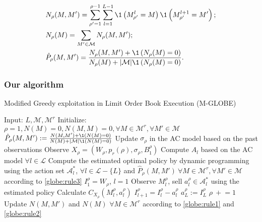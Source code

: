             \begin{align}
                & N_\rho(M, M') = \sum_{\rho' = 1}^{\rho-1} \sum_{l = 1}^{L-1} \1\left(M_{\rho'}^l = M\right) \1\left(M_{\rho'}^{l+1} = M'\right); \label{globe:rule1}\\
                & N_\rho(M) = \sum_{M'\in\mathcal{M}}N_\rho(M, M'); \label{globe:rule2}\\
                & \hat P_\rho(M, M') = \frac{N_\rho(M, M') + \1\left(N_\rho(M) = 0\right)}{N_\rho(M) + |\mathcal M|\1\left(N_\rho(M) = 0\right)}. \label{globe:rule3}
            \end{align}

        \subsubsection{Our algorithm}
            \begin{algorithm}
                \caption[Modified GLOBE Algorithm]{Modified Greedy exploitation in Limit Order Book Execution (M-GLOBE)}
                \begin{algorithmic}
                    \State Input: $L, \mathcal{M}, \mathcal{M}^r$
                    \State Initialize: $\rho = 1, N(M)=0, N(M,M)=0, \forall M \in \mathcal{M}^r , \forall M' \in \mathcal{M}$
                        \State $\hat P_\rho (M, M') := \frac{N(M, M') + \1(N(M) = 0)}{N(M) + |\mathcal M| \1 (N(M) = 0)}$
                        \State Update $\sigma_\rho$ in the AC model based on the past observations
                        \State Observe $X_\rho = (W_\rho, p_r(\rho), \sigma_\rho, B_1^\rho)$
                        \State Compute $A_l$ based on the AC model $\forall l \in \mathcal{L}$
                        \State Compute the estimated optimal policy by dynamic programming using the action set $\mathcal A_l^*$, $\forall l \in \mathcal{L} - \{L\}$ and $\hat P_\rho (M, M')\ \forall M \in \mathcal{M}^r, \forall M' \in \mathcal M$ according to \eqref{globe:rule3}
                        \State $I_1^\rho = W_\rho$, $l=1$
                            \State Observe $M_l^\rho$, sell $a_l^\rho\in \mathcal{A}^*_l$ using the estimated policy
                            \State Calculate $C_{X_\rho}(M_l^\rho, a_l^\rho)$
                            \State $I_{l+1}^\rho = I_l^\rho - a_l^\rho$
                        \EndFor
                        \State $a_{L}^\rho := I_L^\rho$
                        \State $\rho\ +\!\!= 1$
                        \State Update $N(M, M')$ and $N(M)$ $\forall M \in \mathcal{M}^r$ according to \eqref{globe:rule1} and \eqref{globe:rule2}
                    \EndWhile
                \end{algorithmic}
                \label{algorithm:MGLOBE}
            \end{algorithm}


